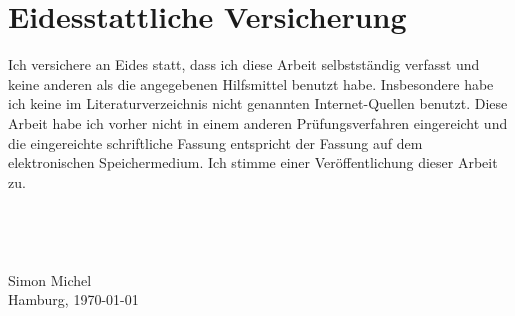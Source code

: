 \documentclass[11pt,twoside,a4paper,fleqn]{report}
\numberwithin{equation}{chapter}
\numberwithin{figure}{chapter}
\numberwithin{table}{chapter}
\begin{document}
\chapter{Eidesstattliche Versicherung}
Ich versichere an Eides statt, dass ich diese Arbeit selbstständig verfasst und keine anderen als die angegebenen Hilfsmittel benutzt habe. Insbesondere habe ich keine im Literaturverzeichnis nicht genannten Internet-Quellen benutzt. Diese Arbeit habe ich vorher nicht in einem anderen Prüfungsverfahren eingereicht und die eingereichte schriftliche Fassung entspricht der Fassung auf dem elektronischen Speichermedium. Ich stimme einer Veröffentlichung dieser Arbeit zu.
\\
\\
\\
\\
\\
Simon Michel\\
Hamburg, \today
\end{document}
